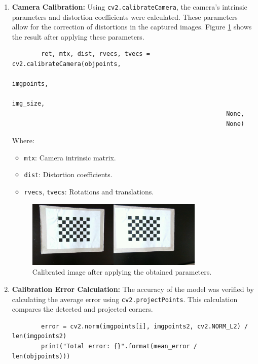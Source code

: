 \begin{enumerate}
        \item \textbf{Camera Calibration:} 
        Using \texttt{cv2.calibrateCamera}, the camera's intrinsic parameters and distortion coefficients were calculated. These parameters allow for the correction of distortions in the captured images. Figure \ref{fig:imagen_calibrada} shows the result after applying these parameters.
        \begin{verbatim}
        ret, mtx, dist, rvecs, tvecs = cv2.calibrateCamera(objpoints, 
                                                           imgpoints, 
                                                           img_size, 
                                                           None, 
                                                           None)
        \end{verbatim}
        Where:
        \begin{itemize}
            \item \texttt{mtx}: Camera intrinsic matrix.
            \item \texttt{dist}: Distortion coefficients.
            \item \texttt{rvecs}, \texttt{tvecs}: Rotations and translations.
        \end{itemize}
        \begin{center}
            \begin{figure}[H]
                \centering
                \includegraphics[width=0.8\textwidth]{pictures/imagenes_calibradas.jpg}
                \caption{Calibrated image after applying the obtained parameters.}
                \label{fig:imagen_calibrada}
            \end{figure}
        \end{center}
    
        \item \textbf{Calibration Error Calculation:} 
        The accuracy of the model was verified by calculating the average error using \texttt{cv2.projectPoints}. This calculation compares the detected and projected corners.
        \begin{verbatim}
        error = cv2.norm(imgpoints[i], imgpoints2, cv2.NORM_L2) / len(imgpoints2)
        print("Total error: {}".format(mean_error / len(objpoints)))
        \end{verbatim}
    

\end{enumerate}
